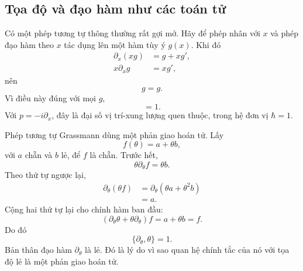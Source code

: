 \begin{classroomqa}
\end{classroomqa}

\begin{classroomqa}
\end{classroomqa}

\subsection{Tọa độ và đạo hàm như các toán tử}

Có một phép tương tự thông thường rất gợi mở. Hãy để phép nhân với \(x\) và phép đạo hàm theo \(x\) tác dụng lên một hàm tùy ý \(g(x)\). Khi đó
\begin{align}
\partial_x\!\left(xg\right)&=g+xg',\\
x\partial_xg&=xg',
\end{align}
nên
\begin{equation}
[\partial_x,x]g=g.
\end{equation}
Vì điều này đúng với mọi \(g\),
\begin{equation}
[\partial_x,x]=1.
\end{equation}
Với \(p=-i\partial_x\), đây là đại số vị trí-xung lượng quen thuộc, trong hệ đơn vị \(\hbar=1\).

Phép tương tự Grassmann dùng một phản giao hoán tử. Lấy
\begin{equation}
f(\theta)=a+\theta b,
\end{equation}
với \(a\) chẵn và \(b\) lẻ, để \(f\) là chẵn. Trước hết,
\begin{equation}
\theta\partial_\theta f=\theta b.
\end{equation}
Theo thứ tự ngược lại,
\begin{align}
\partial_\theta(\theta f)
&=\partial_\theta(\theta a+\theta^2b)\\
&=a.
\end{align}
Cộng hai thứ tự lại cho chính hàm ban đầu:
\begin{equation}
\left(\partial_\theta\theta+\theta\partial_\theta\right)f
=a+\theta b=f.
\end{equation}
Do đó
\begin{equation}
\boxed{\{\partial_\theta,\theta\}=1.}
\end{equation}
Bản thân đạo hàm \(\partial_\theta\) là lẻ. Đó là lý do vì sao quan hệ chính tắc của nó với tọa độ lẻ là một phản giao hoán tử.

